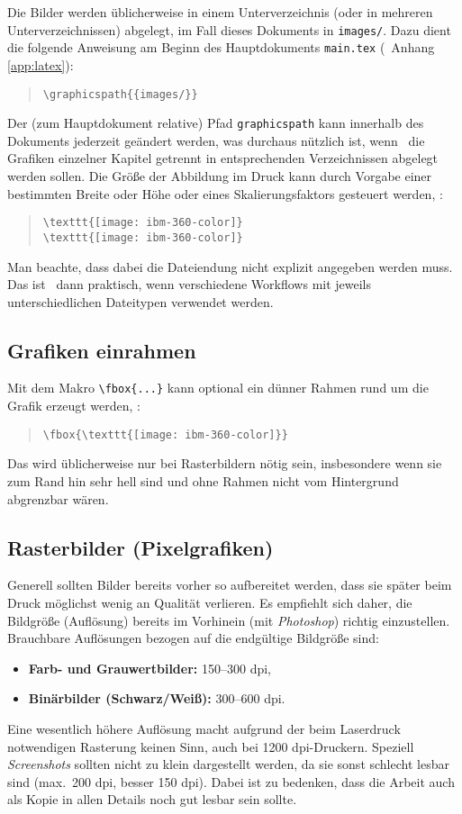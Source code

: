 Die Bilder werden üblicherweise in einem Unterverzeichnis (oder in mehreren
Unterverzeichnissen) abgelegt, im Fall dieses Dokuments in
\nolinkurl{images/}. Dazu dient die folgende Anweisung am Beginn des
Hauptdokuments \nolinkurl{main.tex} (\sa\ Anhang \ref{app:latex}):
%
\begin{quote}
	\verb!\graphicspath{{images/}}!
\end{quote}
%
Der (zum Hauptdokument relative) Pfad \texttt{graphicspath} kann innerhalb
des Dokuments jederzeit geändert werden, was durchaus nützlich ist, wenn \zB\
die Grafiken einzelner Kapitel getrennt in entsprechenden Verzeichnissen
abgelegt werden sollen.
Die Größe der Abbildung im Druck kann durch Vorgabe einer bestimmten Breite
oder Höhe oder eines Skalierungsfaktors gesteuert werden, {\zB}:
%
\begin{quote}
	\verb!\texttt{[image: ibm-360-color]}! \\
	\verb!\texttt{[image: ibm-360-color]}!
\end{quote}
%
Man beachte, dass dabei die Dateiendung nicht explizit angegeben werden muss.
Das ist \va\ dann praktisch, wenn verschiedene Workflows mit jeweils
unterschiedlichen Dateitypen verwendet werden.


\subsection{Grafiken einrahmen}

Mit dem Makro \verb!\fbox{...}! kann optional ein dünner Rahmen rund um die
Grafik erzeugt werden, \zB:
%
\begin{quote}
	\verb!\fbox{\texttt{[image: ibm-360-color]}}!
\end{quote}
%
Das wird üblicherweise nur bei Rasterbildern nötig sein, insbesondere wenn
sie zum Rand hin sehr hell sind und ohne Rahmen nicht vom Hintergrund
abgrenzbar wären.

\subsection{Rasterbilder (Pixelgrafiken)}

Generell sollten Bilder bereits vorher so aufbereitet werden, dass sie später
beim Druck möglichst wenig an Qualität verlieren. Es empfiehlt sich daher,
die Bildgröße (Auflösung) bereits im Vorhinein (\zB mit \emph{Photoshop})
richtig einzustellen.
Brauchbare Auflösungen bezogen auf die endgültige Bildgröße sind:
%
\begin{itemize}
  \item \textbf{Farb- und Grauwertbilder:} 150--300 dpi,
  \item \textbf{Binärbilder (Schwarz/Weiß):} 300--600 dpi.
\end{itemize}
%
Eine wesentlich höhere Auflösung macht aufgrund der beim Laserdruck
notwendigen Rasterung keinen Sinn, auch bei 1200 dpi-Druckern. Speziell
\emph{Screen\-shots} sollten nicht zu klein dargestellt werden, da sie sonst
schlecht lesbar sind (max.\ 200 dpi, besser 150 dpi). Dabei ist zu bedenken,
dass die Arbeit auch als Kopie in allen Details noch gut lesbar sein sollte.

